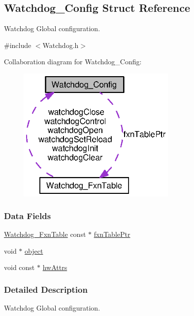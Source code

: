\subsection{Watchdog\-\_\-\-Config Struct Reference}
\label{struct_watchdog___config}


Watchdog Global configuration.  




{\ttfamily \#include $<$Watchdog.\-h$>$}



Collaboration diagram for Watchdog\-\_\-\-Config\-:
\nopagebreak
\begin{figure}[H]
\begin{center}
\leavevmode
\includegraphics[width=220pt]{struct_watchdog___config__coll__graph}
\end{center}
\end{figure}
\subsubsection*{Data Fields}
\begin{DoxyCompactItemize}
\item 
\hyperlink{struct_watchdog___fxn_table}{Watchdog\-\_\-\-Fxn\-Table} const $\ast$ \hyperlink{struct_watchdog___config_a89184eb9474db817513b06dfd86bf96f}{fxn\-Table\-Ptr}
\item 
void $\ast$ \hyperlink{struct_watchdog___config_aa8602245e364f7f910255dbcb14f51d1}{object}
\item 
void const $\ast$ \hyperlink{struct_watchdog___config_a96131766bd4da7bc2239eed02f15bed0}{hw\-Attrs}
\end{DoxyCompactItemize}


\subsubsection{Detailed Description}
Watchdog Global configuration. 

